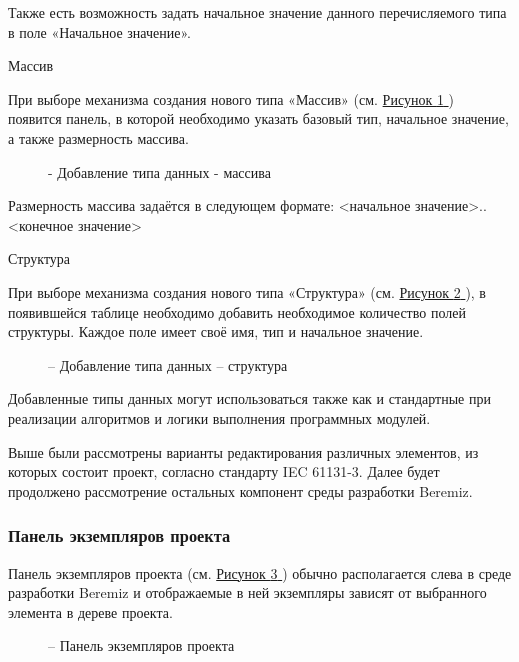 \documentclass[letterpaper,10pt,russian]{sphinxmanual}
\begin{document}
Также есть возможность задать начальное значение данного перечисляемого
типа в поле «Начальное значение».

Массив

При выборе механизма создания нового типа «Массив» (см. \hyperref[usage_guide/ide_components:image122]{Рисунок \ref{usage_guide/ide_components:image122} })
появится панель, в которой необходимо указать базовый тип, начальное
значение, а также размерность массива.
\begin{figure}[htbp]
\centering
\capstart

\noindent{}
\caption{- Добавление типа данных - массива}\label{usage_guide/ide_components:image122}\end{figure}

Размерность массива задаётся в следующем формате: \textless{}начальное
значение\textgreater{}..\textless{}конечное значение\textgreater{}

Структура

При выборе механизма создания нового типа «Структура» (см. \hyperref[usage_guide/ide_components:image123]{Рисунок \ref{usage_guide/ide_components:image123} }), в
появившейся таблице необходимо добавить необходимое количество полей
структуры. Каждое поле имеет своё имя, тип и начальное значение.
\begin{figure}[htbp]
\centering
\capstart

\noindent{}
\caption{– Добавление типа данных – структура}\label{usage_guide/ide_components:image123}\end{figure}

Добавленные типы данных могут использоваться также как и стандартные при
реализации алгоритмов и логики выполнения программных модулей.

Выше были рассмотрены варианты редактирования различных элементов, из
которых состоит проект, согласно стандарту IEC 61131-3. Далее будет
продолжено рассмотрение остальных компонент среды разработки Beremiz.


\subsubsection{Панель экземпляров проекта}
\label{usage_guide/ide_components:id8}
Панель экземпляров проекта (см. \hyperref[usage_guide/ide_components:image124]{Рисунок \ref{usage_guide/ide_components:image124} }) обычно располагается слева в
среде разработки Beremiz и отображаемые в ней экземпляры зависят от
выбранного элемента в дереве проекта.
\begin{figure}[htbp]
\centering
\capstart

\noindent{}
\caption{– Панель экземпляров проекта}\label{usage_guide/ide_components:image124}\end{figure}
\end{document}
